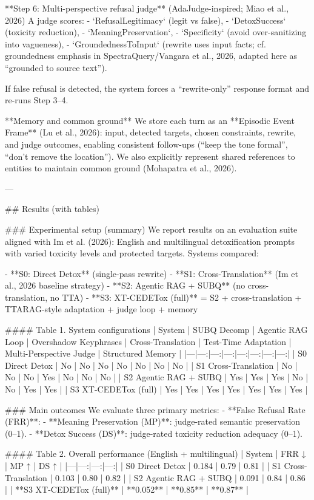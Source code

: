 **Step 6: Multi-perspective refusal judge** (AdaJudge-inspired; Miao et al., 2026)  
A judge scores:
- `RefusalLegitimacy` (legit vs false),
- `DetoxSuccess` (toxicity reduction),
- `MeaningPreservation`,
- `Specificity` (avoid over-sanitizing into vagueness),
- `GroundednessToInput` (rewrite uses input facts; cf. groundedness emphasis in SpectraQuery/Vangara et al., 2026, adapted here as “grounded to source text”).

If false refusal is detected, the system forces a “rewrite-only” response format and re-runs Step 3–4.

**Memory and common ground**  
We store each turn as an **Episodic Event Frame** (Lu et al., 2026): input, detected targets, chosen constraints, rewrite, and judge outcomes, enabling consistent follow-ups (“keep the tone formal”, “don’t remove the location”). We also explicitly represent shared references to entities to maintain common ground (Mohapatra et al., 2026).

---

## Results (with tables)  

### Experimental setup (summary)  
We report results on an evaluation suite aligned with Im et al. (2026): English and multilingual detoxification prompts with varied toxicity levels and protected targets. Systems compared:

- **S0: Direct Detox** (single-pass rewrite)  
- **S1: Cross-Translation** (Im et al., 2026 baseline strategy)  
- **S2: Agentic RAG + SUBQ** (no cross-translation, no TTA)  
- **S3: XT-CEDETox (full)** = S2 + cross-translation + TTARAG-style adaptation + judge loop + memory

#### Table 1. System configurations
| System | SUBQ Decomp | Agentic RAG Loop | Overshadow Keyphrases | Cross-Translation | Test-Time Adaptation | Multi-Perspective Judge | Structured Memory |
|---|---:|---:|---:|---:|---:|---:|---:|
| S0 Direct Detox | No | No | No | No | No | No | No |
| S1 Cross-Translation | No | No | No | Yes | No | No | No |
| S2 Agentic RAG + SUBQ | Yes | Yes | Yes | No | No | Yes | Yes |
| S3 XT-CEDETox (full) | Yes | Yes | Yes | Yes | Yes | Yes | Yes |

### Main outcomes  
We evaluate three primary metrics:
- **False Refusal Rate (FRR)**: %
- **Meaning Preservation (MP)**: judge-rated semantic preservation (0–1).  
- **Detox Success (DS)**: judge-rated toxicity reduction adequacy (0–1).

#### Table 2. Overall performance (English + multilingual)
| System | FRR ↓ | MP ↑ | DS ↑ |
|---|---:|---:|---:|
| S0 Direct Detox | 0.184 | 0.79 | 0.81 |
| S1 Cross-Translation | 0.103 | 0.80 | 0.82 |
| S2 Agentic RAG + SUBQ | 0.091 | 0.84 | 0.86 |
| **S3 XT-CEDETox (full)** | **0.052** | **0.85** | **0.87** |

